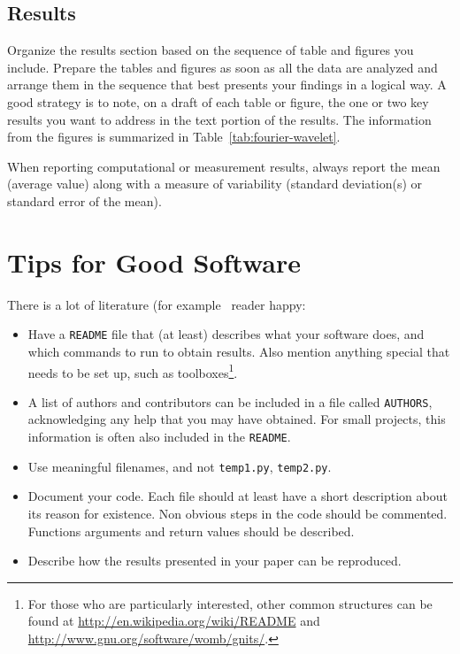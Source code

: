 \documentclass[10pt,conference,compsocconf]{IEEEtran}
\begin{document}
\subsection{Results}

Organize the results section based on the sequence of table and
figures you include. Prepare the tables and figures as soon as all
the data are analyzed and arrange them in the sequence that best
presents your findings in a logical way. A good strategy is to note,
on a draft of each table or figure, the one or two key results you
want to address in the text portion of the results.
The information from the figures is
summarized in Table~\ref{tab:fourier-wavelet}.


When reporting computational or measurement results, always
report the mean (average value) along with a measure of variability
(standard deviation(s) or standard error of the mean).


\section{Tips for Good Software}
\label{sec:tips-software}

There is a lot of literature (for example~
reader happy:
\begin{itemize}
\item Have a \texttt{README} file that (at least) describes what your
  software does, and which commands to run to obtain results. Also
  mention anything special that needs to be set up, such as
  toolboxes\footnote{For those who are
  particularly interested, other common structures can be found at
  \url{http://en.wikipedia.org/wiki/README} and
  \url{http://www.gnu.org/software/womb/gnits/}.}.
\item A list of authors and contributors can be included in a file
  called \texttt{AUTHORS}, acknowledging any help that you may have
  obtained. For small projects, this information is often also
  included in the \texttt{README}.
\item Use meaningful filenames, and not \texttt{temp1.py},
  \texttt{temp2.py}. 
\item Document your code. Each file should at least have a short
  description about its reason for existence. Non obvious steps in the
  code should be commented. Functions arguments and return values should be described.
\item Describe how the results presented in your paper can be reproduced.
\end{itemize}
\end{document}

